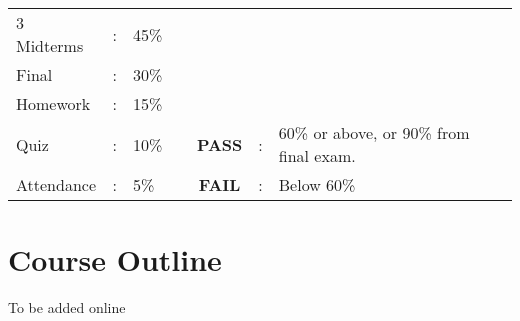 \documentclass[handout]{ximera}
\begin{document}
\begin{tabular}[c]{lllcccl}
3 Midterms  & : & 45\% & \,\hspace{2cm} &  & & \\  
Final & : & 30\% & \hspace{2cm} & & & \\  
Homework & : & 15\% & \hspace{2cm} & & & \\  
Quiz & : & 10\% & \hspace{2cm} & {\bf PASS}& :& 60\% or above, or 90\% from final exam.\\  
Attendance & : & 5\% & \hspace{2cm} & {\bf FAIL}& : & Below 60\%\\  
\end{tabular}


\section*{Course Outline}

To be added online


\end{document}
